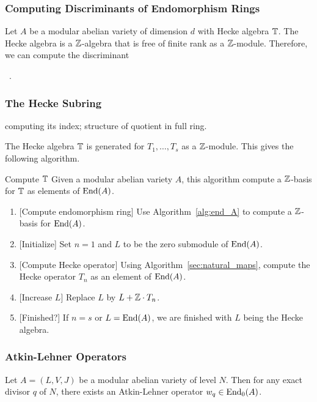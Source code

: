 \documentclass{article}
\begin{document}
\subsubsection{Computing Discriminants of Endomorphism Rings}

Let $A$ be a modular abelian variety of dimension $d$ with Hecke algebra $\mathbb{T}$.
The Hecke algebra is a $\mathbb{Z}$-algebra that is free of finite rank as a
$\mathbb{Z}$-module. Therefore, we can compute the discriminant

~\cite[\S 2]{calegari-stein:disc}.

\subsubsection{The Hecke Subring}
computing its index; structure of quotient in full ring.

The Hecke algebra $\mathbb{T}$ is generated for $T_1,\ldots,T_s$ as a
$\mathbb{Z}$-module. This gives the following algorithm.
\begin{algorithm}{Compute $\mathbb{T}$}
    Given a modular abelian variety $A$, this algorithm compute a $\mathbb{Z}$-basis
    for $\mathbb{T}$ as elements of $\operatorname{End}(A)$.
    \begin{enumerate}
        \item{} [Compute endomorphism ring]
            Use Algorithm~\ref{alg:end_A} to compute a $\mathbb{Z}$-basis for
            $\operatorname{End}(A)$.
        \item{} [Initialize]
            Set $n=1$ and $L$ to be the zero submodule of $\operatorname{End}(A)$.
        \item{} [Compute Hecke operator]
            Using Algorithm~\ref{sec:natural_maps}, compute the Hecke operator
            $T_n$ as an element of $\operatorname{End}(A)$.
        \item{} [Increase $L$]
            Replace $L$ by $L+\mathbb{Z}\cdot T_n$.
        \item{} [Finished?]
            If $n=s$ or $L=\operatorname{End}(A)$, we are finished with $L$ being the Hecke
            algebra.
    \end{enumerate}
\end{algorithm} 

\subsubsection{Atkin-Lehner Operators}

Let $A=(L, V, J)$ be a modular abelian variety of level $N$. Then for any exact
divisor $q$ of $N$, there exists an Atkin-Lehner operator $w_q\in \operatorname{End}_0(A)$.
\end{document}
